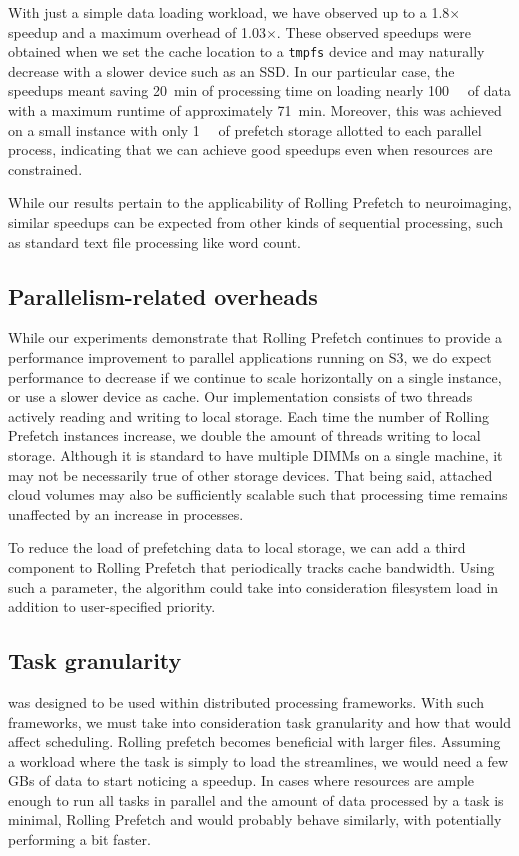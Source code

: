 With just a simple data loading workload, we have observed up to a 1.8$\times$ speedup and a maximum overhead of 1.03$\times$. These observed speedups were
obtained when we set the cache location to a \texttt{tmpfs} device and may naturally decrease with a slower device such as an SSD. In our particular case, the speedups meant saving 20~min of processing time
on loading nearly \SI{100}{\gibi\byte} of data with a maximum runtime of approximately 71~min. Moreover, this
was achieved on a small instance with only \SI{1}{\gibi\byte} of prefetch storage allotted to each parallel
process, indicating that we can achieve good speedups even when resources are constrained. 

While our results pertain to the applicability of Rolling Prefetch to neuroimaging, similar speedups can be expected from other kinds of sequential processing, such as standard text file processing like word count.

\subsection{Parallelism-related overheads}

While our experiments demonstrate that Rolling Prefetch continues to provide a performance improvement to parallel
applications running on S3, we do expect  performance to decrease if we continue to scale horizontally on
a single instance, or use a slower device as cache. Our implementation consists of two threads actively reading and writing to local storage. Each time the number of Rolling
Prefetch instances increase, we double the amount of threads writing to local storage. Although it is standard
to have multiple DIMMs on a single machine, it may
not be necessarily true of other storage devices. That being said, attached cloud volumes may
also be sufficiently scalable such that processing time remains unaffected by an increase in processes.

To reduce the load of prefetching data to local storage, we can add a third component to Rolling Prefetch that periodically tracks cache bandwidth. Using such a parameter, the algorithm could take into consideration filesystem 
load in addition to user-specified priority.


\subsection{Task granularity}
\sfs was designed to be used within distributed processing frameworks. With such frameworks, we must take into consideration task granularity and how that would affect
scheduling. Rolling prefetch becomes beneficial with larger files. Assuming a workload where the task is simply to load the streamlines, we would need a few
GBs of data to start noticing a speedup. In cases where resources are ample enough to run all tasks in
parallel and the amount of data processed by a task is minimal, Rolling Prefetch and \sfs would probably behave
similarly, with \sfs potentially performing a bit faster.

